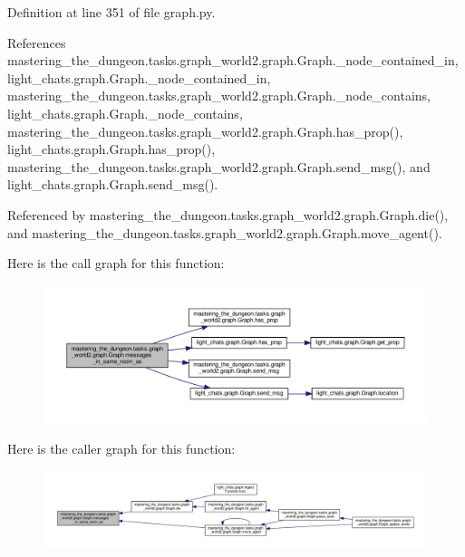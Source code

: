 Definition at line 351 of file graph.\+py.



References mastering\+\_\+the\+\_\+dungeon.\+tasks.\+graph\+\_\+world2.\+graph.\+Graph.\+\_\+node\+\_\+contained\+\_\+in, light\+\_\+chats.\+graph.\+Graph.\+\_\+node\+\_\+contained\+\_\+in, mastering\+\_\+the\+\_\+dungeon.\+tasks.\+graph\+\_\+world2.\+graph.\+Graph.\+\_\+node\+\_\+contains, light\+\_\+chats.\+graph.\+Graph.\+\_\+node\+\_\+contains, mastering\+\_\+the\+\_\+dungeon.\+tasks.\+graph\+\_\+world2.\+graph.\+Graph.\+has\+\_\+prop(), light\+\_\+chats.\+graph.\+Graph.\+has\+\_\+prop(), mastering\+\_\+the\+\_\+dungeon.\+tasks.\+graph\+\_\+world2.\+graph.\+Graph.\+send\+\_\+msg(), and light\+\_\+chats.\+graph.\+Graph.\+send\+\_\+msg().



Referenced by mastering\+\_\+the\+\_\+dungeon.\+tasks.\+graph\+\_\+world2.\+graph.\+Graph.\+die(), and mastering\+\_\+the\+\_\+dungeon.\+tasks.\+graph\+\_\+world2.\+graph.\+Graph.\+move\+\_\+agent().

Here is the call graph for this function\+:
\nopagebreak
\begin{figure}[H]
\begin{center}
\leavevmode
\includegraphics[width=350pt]{classmastering__the__dungeon_1_1tasks_1_1graph__world2_1_1graph_1_1Graph_ab1f0ec6ea5faeb9dfcaa40b50d007649_cgraph}
\end{center}
\end{figure}
Here is the caller graph for this function\+:
\nopagebreak
\begin{figure}[H]
\begin{center}
\leavevmode
\includegraphics[width=350pt]{classmastering__the__dungeon_1_1tasks_1_1graph__world2_1_1graph_1_1Graph_ab1f0ec6ea5faeb9dfcaa40b50d007649_icgraph}
\end{center}
\end{figure}
\mbox{\label{classmastering__the__dungeon_1_1tasks_1_1graph__world2_1_1graph_1_1Graph_a6a9b3f161580f744e976edd2e67f1b23}} 

